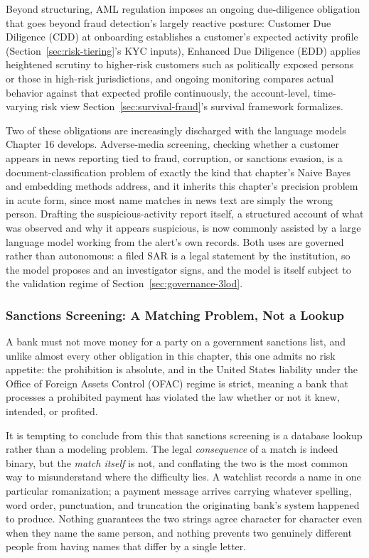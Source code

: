 \documentclass[../ai_in_finance]{subfiles}
\begin{document}
Beyond structuring, AML regulation imposes an ongoing due-diligence obligation that goes beyond fraud detection's largely reactive posture: Customer Due Diligence (CDD) at onboarding establishes a customer's expected activity profile (Section~\ref{sec:risk-tiering}'s KYC inputs), Enhanced Due Diligence (EDD) applies heightened scrutiny to higher-risk customers such as politically exposed persons or those in high-risk jurisdictions, and ongoing monitoring compares actual behavior against that expected profile continuously, the account-level, time-varying risk view Section~\ref{sec:survival-fraud}'s survival framework formalizes.

Two of these obligations are increasingly discharged with the language models Chapter 16 develops. Adverse-media screening, checking whether a customer appears in news reporting tied to fraud, corruption, or sanctions evasion, is a document-classification problem of exactly the kind that chapter's Naive Bayes and embedding methods address, and it inherits this chapter's precision problem in acute form, since most name matches in news text are simply the wrong person. Drafting the suspicious-activity report itself, a structured account of what was observed and why it appears suspicious, is now commonly assisted by a large language model working from the alert's own records. Both uses are governed rather than autonomous: a filed SAR is a legal statement by the institution, so the model proposes and an investigator signs, and the model is itself subject to the validation regime of Section~\ref{sec:governance-3lod}.

\subsubsection*{Sanctions Screening: A Matching Problem, Not a Lookup}
\label{sec:sanctions-screening}

A bank must not move money for a party on a government sanctions list, and unlike almost every other obligation in this chapter, this one admits no risk appetite: the prohibition is absolute, and in the United States liability under the Office of Foreign Assets Control (OFAC) regime is strict, meaning a bank that processes a prohibited payment has violated the law whether or not it knew, intended, or profited.

It is tempting to conclude from this that sanctions screening is a database lookup rather than a modeling problem. The legal \emph{consequence} of a match is indeed binary, but the \emph{match itself} is not, and conflating the two is the most common way to misunderstand where the difficulty lies. A watchlist records a name in one particular romanization; a payment message arrives carrying whatever spelling, word order, punctuation, and truncation the originating bank's system happened to produce. Nothing guarantees the two strings agree character for character even when they name the same person, and nothing prevents two genuinely different people from having names that differ by a single letter.
\end{document}
